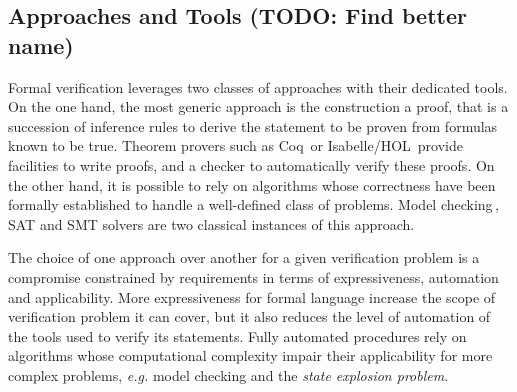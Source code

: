 
\subsection{Approaches and Tools (TODO: Find better name)}

%
%

Formal verification leverages two classes of approaches with their dedicated
tools.
%
On the one hand, the most generic approach is the construction a proof, that is
a succession of inference rules to derive the statement to be proven from
formulas known to be true.
%
Theorem provers such as Coq\,\cite{coq} or
Isabelle/HOL\,\cite{nipkow2002isabelle} provide facilities to write proofs, and
a checker to automatically verify these proofs.
%
On the other hand, it is possible to rely on algorithms whose correctness have
been formally established to handle a well-defined class of problems.
%
Model checking\,\cite{clarke2018modelc}, SAT and SMT solvers are
two classical instances of this approach.

The choice of one approach over another for a given verification problem is a
compromise constrained by requirements in terms of expressiveness, automation
and applicability.
%
More expressiveness for formal language increase the scope of verification
problem it can cover, but it also reduces the level of automation of the tools
used to verify its statements.
%
Fully automated procedures rely on algorithms whose computational complexity
impair their applicability for more complex problems, \emph{e.g.}  model
checking and the \emph{state explosion problem}.

